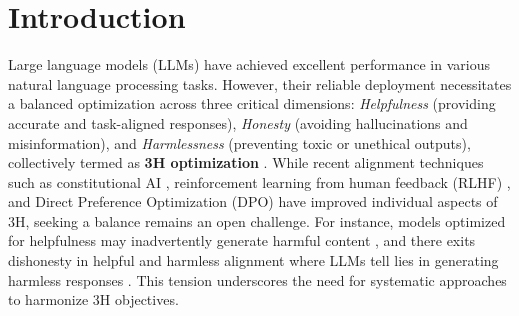 \section{Introduction}

Large language models (LLMs) have achieved excellent performance in various natural language processing tasks. However, their reliable deployment necessitates a balanced optimization across three critical dimensions: \textit{Helpfulness} (providing accurate and task-aligned responses), \textit{Honesty} (avoiding hallucinations and misinformation), and \textit{Harmlessness} (preventing toxic or unethical outputs), collectively termed as \textbf{3H optimization} \cite{bai2022training,guo2024controllable,sonkar2024pedagogical,yang2024dialectical}. While recent alignment techniques such as constitutional AI \cite{bai2022constitutional}, reinforcement learning from human feedback (RLHF) \cite{dai2023safe}, and Direct Preference Optimization (DPO) \cite{rafailov2024direct} have improved individual aspects of 3H, seeking a balance remains an open challenge. For instance, models optimized for helpfulness may inadvertently generate harmful content \cite{ji2024pku}, and there exits dishonesty in helpful and harmless alignment where LLMs tell lies in generating harmless responses \cite{huang2024dishonesty}. This tension underscores the need for systematic approaches to harmonize 3H objectives.


